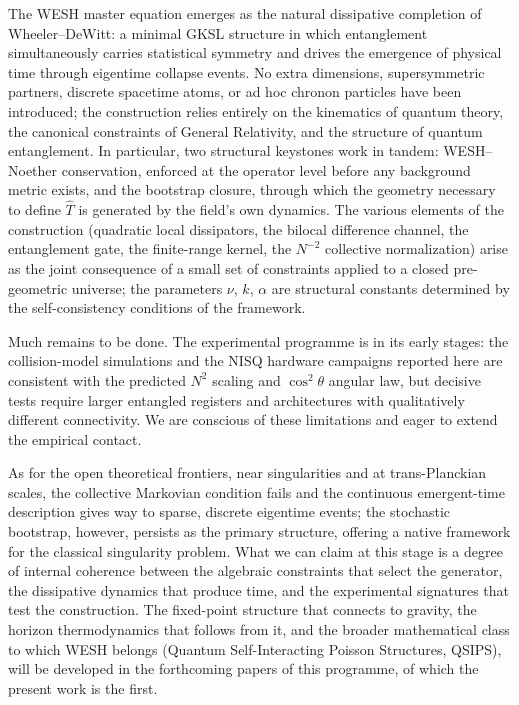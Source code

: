 \documentclass[12pt,a4paper]{article}
\numberwithin{equation}{section}
\begin{document}
\vspace{0.3cm}
\noindent The WESH master equation emerges as the natural dissipative completion of Wheeler--DeWitt: a minimal GKSL structure in which entanglement simultaneously carries statistical symmetry and drives the emergence of physical time through eigentime collapse events. No extra dimensions, supersymmetric partners, discrete spacetime atoms, or ad hoc chronon particles have been introduced; the construction relies entirely on the kinematics of quantum theory, the canonical constraints of General Relativity, and the structure of quantum entanglement. In particular, two structural keystones work in tandem: WESH--Noether conservation, enforced at the operator level before any background metric exists, and the bootstrap closure, through which the geometry necessary to define $\hat{T}$ is generated by the field's own dynamics. The various elements of the construction (quadratic local dissipators, the bilocal difference channel, the entanglement gate, the finite-range kernel, the $N^{-2}$ collective normalization) arise as the joint consequence of a small set of constraints applied to a closed pre-geometric universe; the parameters $\nu$, $k$, $\alpha$ are structural constants determined by the self-consistency conditions of the framework.

\vspace{0.3cm}
\noindent Much remains to be done. The experimental programme is in its early stages: the collision-model simulations and the NISQ hardware campaigns reported here are consistent with the predicted $N^2$ scaling and $\cos^2\theta$ angular law, but decisive tests require larger entangled registers and architectures with qualitatively different connectivity. We are conscious of these limitations and eager to extend the empirical contact.

\vspace{0.3cm}
\noindent As for the open theoretical frontiers, near singularities and at trans-Planckian scales, the collective Markovian condition fails and the continuous emergent-time description gives way to sparse, discrete eigentime events; the stochastic bootstrap, however, persists as the primary structure, offering a native framework for the classical singularity problem. What we can claim at this stage is a degree of internal coherence between the algebraic constraints that select the generator, the dissipative dynamics that produce time, and the experimental signatures that test the construction. The fixed-point structure that connects to gravity, the horizon thermodynamics that follows from it, and the broader mathematical class to which WESH belongs (Quantum Self-Interacting Poisson Structures, QSIPS), will be developed in the forthcoming papers of this programme, of which the present work is the first.
\vspace{0.8cm}
\end{document}
